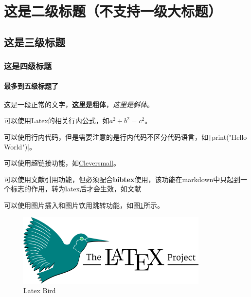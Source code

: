\documentclass{ctexart} %
\begin{document}
\section{这是二级标题（不支持一级大标题）}

\subsection{这是三级标题}

\subsubsection{这是四级标题}

\paragraph{最多到五级标题了}

\par 这是一段正常的文字，\textbf{这里是粗体}，\textit{这里是斜体}。

\par 可以使用Latex的相关行内公式，如$a^2+b^2=c^2$。

\par 可以使用行内代码，但是需要注意的是行内代码不区分代码语言，如\texttt|print("Hello World")|。

\par 可以使用超链接功能，如\href{https://www.cleversmall.com}{Cleversmall}。

\par 可以使用文献引用功能，但必须配合\textbf{bibtex}使用，该功能在markdown中只起到一个标志的作用，转为latex后才会生效，如文献\cite{name2024paper}

\par 可以使用图片插入和图片饮用跳转功能，如图\ref{fig1}所示。

\begin{figure}[ht]
    \centering
    \includegraphics[width=\textwidth]{./figure/latex_bird.png}
    \caption{Latex Bird}
    \label{fig1}
\end{figure}
\end{document}
